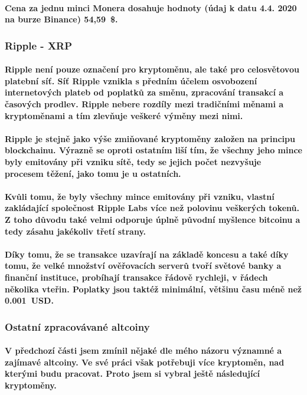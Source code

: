 \documentclass[thesis=B,czech]{FITthesis}[2019/03/21]
\begin{document}
\paragraph{
Cena za jednu minci Monera dosahuje hodnoty (údaj k datu 4.4. 2020 na burze Binance) 54,59~\$. \cite{binance_markets}
}
\subsubsection{Ripple - XRP}
\paragraph{
Ripple není pouze označení pro kryptoměnu, ale také pro celosvětovou platební síť. Síť Ripple vznikla s předním účelem osvobození internetových plateb od poplatků za směnu, zpracování transakcí a časových prodlev. Ripple nebere rozdíly mezi tradičními měnami a kryptoměnami a tím zlevňuje veškeré výměny mezi nimi.
}
\paragraph{
Ripple je stejně jako výše zmiňované kryptoměny založen na principu blockchainu. Výrazně se oproti ostatním liší tím, že všechny jeho mince byly emitovány při vzniku sítě, tedy se jejich počet nezvyšuje procesem těžení, jako tomu je u ostatních.
}
\paragraph{
Kvůli tomu, že byly všechny mince emitovány při vzniku, vlastní zakládající společnost Ripple Labs více než polovinu veškerých tokenů. Z toho důvodu také velmi odporuje úplně původní myšlence bitcoinu a tedy zásahu jakékoliv třetí strany. \cite{alza_ripple}
}
\paragraph{
Díky tomu, že se transakce uzavírají na základě koncesu a také díky tomu, že velké množství ověřovacích serverů tvoří světové banky a finanční instituce, probíhají transakce řádově rychleji, v řádech několika vteřin. Poplatky jsou taktéž minimální, většinu času méně než 0.001~USD. \cite{bitinfocharts} \cite{coincodex_ripple}
}
\subsubsection{Ostatní zpracovávané altcoiny}
\paragraph{
V předchozí části jsem zmínil nějaké dle mého názoru významné a zajímavé altcoiny. Ve své práci však potřebuji více kryptoměn, nad kterými budu pracovat. Proto jsem si vybral ještě následující kryptoměny.
}
\end{document}
